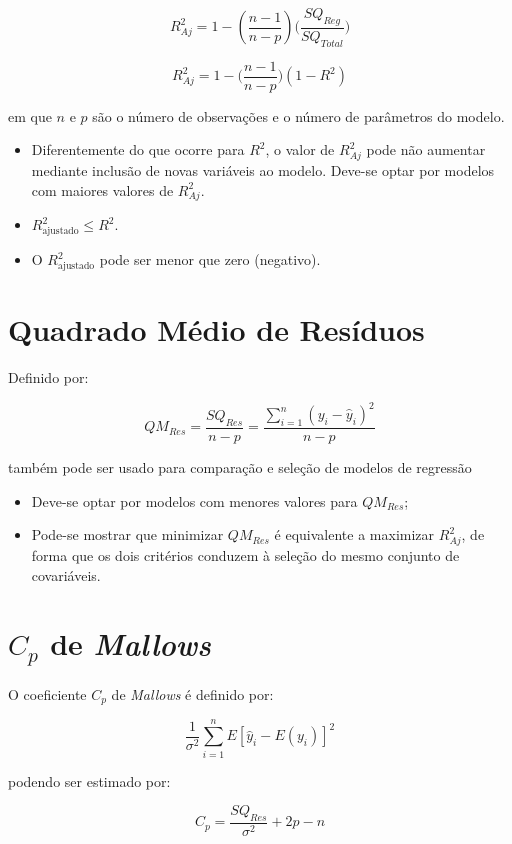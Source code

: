 $$R^2_{Aj}= 1 -\left ( \dfrac{n-1}{n-p} \right ) \bigg(\dfrac{SQ_{Reg}}{SQ_{Total}}\bigg)$$

$$R^2_{Aj}= 1 -\bigg( \frac{n-1}{n-p} \bigg) \left(1-R^2\right)$$

\noindent em que $n$ e $p$ são o número de observações e o número de parâmetros do modelo.

\begin{itemize}
\item Diferentemente do que ocorre para $R^2$, o valor de $R^2_{Aj}$ pode não
aumentar mediante inclusão de novas variáveis ao modelo. Deve-se optar por modelos com maiores valores de $R^2_{Aj}$.

\item $R^2_{\text{ajustado}} \leq R^2$.

\item O $R^2_{\text{ajustado}}$ pode ser menor que zero (negativo).
\end{itemize}

\section{Quadrado Médio de Resíduos}

\noindent Definido por:

$$QM_{Res}= \frac{SQ_{Res}}{n-p}=\frac{\sum_{i=1}^{n}(y_i-\widehat{y}_i)^2}{n-p}$$

\noindent também pode ser usado para comparação e seleção de modelos de regressão
\begin{itemize}
\item Deve-se optar por modelos com menores valores para $QM_{Res}$;
\item Pode-se mostrar que minimizar $QM_{Res}$ é equivalente a maximizar $R^2_{Aj}$, de forma que os dois critérios conduzem à seleção do mesmo conjunto
de covariáveis.
\end{itemize}

\section{$C_p$ de \textit{Mallows}}

\noindent O coeficiente $C_p$ de \textit{Mallows} \cite{mallows2000some} é definido por:

$$\frac{1}{\sigma^2}\sum_{i=1}^{n}E[\widehat{y}_i-E(y_i)]^2$$

\noindent podendo ser estimado por:

$$C_p=\frac{SQ_{Res}}{\sigma^2}+2p-n$$

